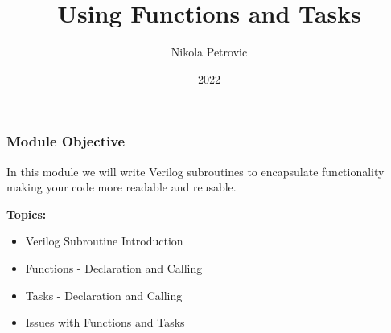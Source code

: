 \documentclass[t, notes, xcolor=table]{beamer}
\title{Using Functions and Tasks}
\author{Nikola Petrovic}
\institute{University of Belgrade, School of Electrical Engineering}
\date{2022}
\begin{document}
\frame{\titlepage}

\begin{frame}
\frametitle{Module Objective}
In this module we will write Verilog subroutines to encapsulate functionality making your code more readable and reusable.
\newline

\textbf{Topics:}
\begin{itemize}
\item Verilog Subroutine Introduction
\item Functions - Declaration and Calling
\item Tasks - Declaration and Calling
\item Issues with Functions and Tasks
\end{itemize}

\end{frame}
\end{document}
